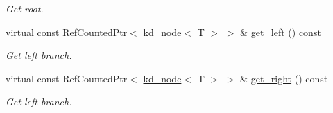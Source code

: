 \begin{DoxyCompactItemize}
\begin{DoxyCompactList}\small\item\em Get root. \end{DoxyCompactList}\item 
virtual const Ref\+Counted\+Ptr$<$ \hyperlink{classkd__node}{kd\+\_\+node}$<$ T $>$ $>$ \& \hyperlink{classkd__node_ac62910738bcef306dbd0c5c560a43bf1}{get\+\_\+left} () const 
\begin{DoxyCompactList}\small\item\em Get left branch. \end{DoxyCompactList}\item 
virtual const Ref\+Counted\+Ptr$<$ \hyperlink{classkd__node}{kd\+\_\+node}$<$ T $>$ $>$ \& \hyperlink{classkd__node_ac9495174451bf8a56c56aa94b972b442}{get\+\_\+right} () const 
\begin{DoxyCompactList}\small\item\em Get left branch. \end{DoxyCompactList}\end{DoxyCompactItemize}
